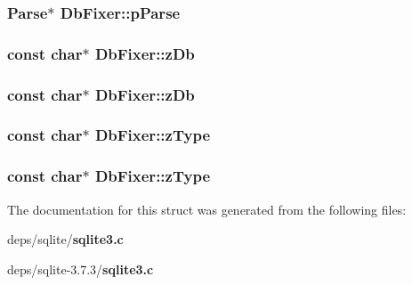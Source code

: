\subsubsection{\setlength{\rightskip}{0pt plus 5cm}\bf{Parse}$\ast$ \bf{Db\-Fixer::p\-Parse}}\label{structDbFixer_71ccbd9cf9da902ed22694f7fcac2405}


\subsubsection{\setlength{\rightskip}{0pt plus 5cm}const char$\ast$ \bf{Db\-Fixer::z\-Db}}\label{structDbFixer_37e634d2dabc02e60a612a0fd90c22b3}


\subsubsection{\setlength{\rightskip}{0pt plus 5cm}const char$\ast$ \bf{Db\-Fixer::z\-Db}}\label{structDbFixer_37e634d2dabc02e60a612a0fd90c22b3}


\subsubsection{\setlength{\rightskip}{0pt plus 5cm}const char$\ast$ \bf{Db\-Fixer::z\-Type}}\label{structDbFixer_6f4126e5d05f9ef9edcd9632959090cb}


\subsubsection{\setlength{\rightskip}{0pt plus 5cm}const char$\ast$ \bf{Db\-Fixer::z\-Type}}\label{structDbFixer_6f4126e5d05f9ef9edcd9632959090cb}




The documentation for this struct was generated from the following files:\begin{CompactItemize}
\item 
deps/sqlite/\bf{sqlite3.c}\item 
deps/sqlite-3.7.3/\bf{sqlite3.c}\end{CompactItemize}
